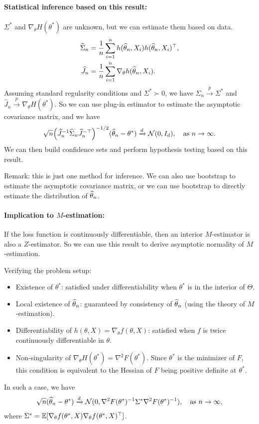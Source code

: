 \documentclass[11pt,letterpaper]{article}
\numberwithin{assumption}{lecture}
\numberwithin{theorem}{lecture}
\numberwithin{proposition}{lecture}
\numberwithin{lemma}{lecture}
\numberwithin{claim}{lecture}
\numberwithin{corollary}{lecture}
\numberwithin{definition}{lecture}
\numberwithin{conjecture}{lecture}
\numberwithin{remark}{lecture}
\numberwithin{example}{lecture}
\numberwithin{equation}{lecture}
\begin{document}
\paragraph{Statistical inference based on this result:} $\Sigma^*$ and $\nabla_\theta H (\theta^*)$ are unknown, but we can estimate them based on data.
\begin{align*}
  \widehat{\Sigma}_n &= \frac{1}{n} \sum_{i=1}^n h(\widehat{\theta}_n, X_i) h(\widehat{\theta}_n, X_i)^\top,\\
 \widehat{J}_n &= \frac{1}{n} \sum_{i=1}^n \nabla_\theta h(\widehat{\theta}_n, X_i).
\end{align*}
Assuming standard regularity conditions and $\Sigma^*\succ0$, we have $\widehat{\Sigma}_n \xrightarrow{p} \Sigma^*$ and $\widehat{J}_n \xrightarrow{p} \nabla_\theta H (\theta^*)$. So we can use plug-in estimator to estimate the asymptotic covariance matrix, and we have
\begin{align*}
  \sqrt{n} \Big( \widehat{J}_n^{-1} \widehat{\Sigma}_n \widehat{J}_n^{-\top} \Big)^{-1/2} (\widehat{\theta}_n - \theta^*) \xrightarrow{d} \mathcal{N} (0, I_d), \quad \text{as } n \to \infty.
\end{align*}
We can then build confidence sets and perform hypothesis testing based on this result.

Remark: this is just one method for inference. We can also use bootstrap to estimate the asymptotic covariance matrix, or we can use bootstrap to directly estimate the distribution of $\widehat{\theta}_n$.

\paragraph{Implication to $M$-estimation:} If the loss function is continuously differentiable, then an interior $M$-estimator is also a $Z$-estimator. So we can use this result to derive asymptotic normality of $M$-estimation.


Verifying the problem setup:
\begin{itemize}
  \item Existence of $\theta^*$: satisfied under differentiability when $\theta^*$ is in the interior of $\Theta$.
  \item Local existence of $\widehat{\theta}_n$: guaranteed by consistency of $\widehat{\theta}_n$ (using the theory of $M$-estimation).
  \item Differentiability of $h (\theta, X) = \nabla_\theta f(\theta, X)$: satisfied when $f$ is {\color{red} twice} continuously differentiable in $\theta$.
  \item Non-singularity of $\nabla_\theta H (\theta^*) = \nabla^2 F(\theta^*)$. Since $\theta^*$ is the minimizer of $F$, this condition is equivalent to the Hessian of $F$ being positive definite at $\theta^*$.
\end{itemize}
In such a case, we have
\begin{align*}
  \sqrt{n} (\widehat{\theta}_n - \theta^*) \xrightarrow{d} \mathcal{N} (0, \nabla^2 F(\theta^*)^{-1} \Sigma^* \nabla^2 F(\theta^*)^{-1}), \quad \text{as } n \to \infty,
\end{align*}
where $\Sigma^* = {\mathbb{E}} [\nabla_\theta f(\theta^*, X) \nabla_\theta f(\theta^*, X)^\top]$.
\end{document}
